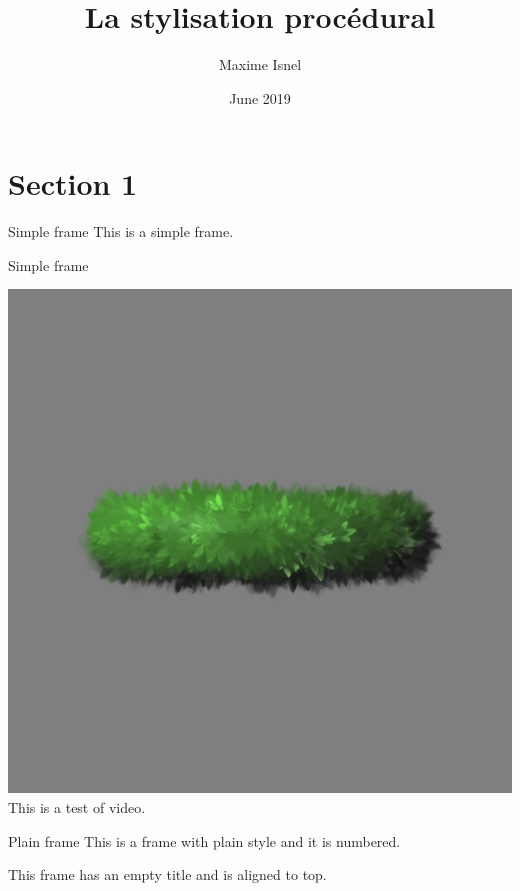 \documentclass{beamer}
\title{La stylisation procédural}
\author{Maxime Isnel}
\institute{supervisé par \\ Joëlle Thollot\\ et Romain Vergne}
\date{June 2019}
\begin{document}
    \begin{frame}
        \maketitle
    \end{frame}

    \section{Section 1}
    \begin{frame}{Simple frame}
        This is a simple frame.
    \end{frame}

    \begin{frame}{Simple frame}

        \href{run:videos/leaves02.mp4?autostart&loop}{\includegraphics{images/leaves02.png}}
        This is a test of video.
    \end{frame}

    \begin{frame}[plain]{Plain frame}
        This is a frame with plain style and it is numbered.
    \end{frame}

    \begin{frame}[t]
        This frame has an empty title and is aligned to top.
    \end{frame}
\end{document}
